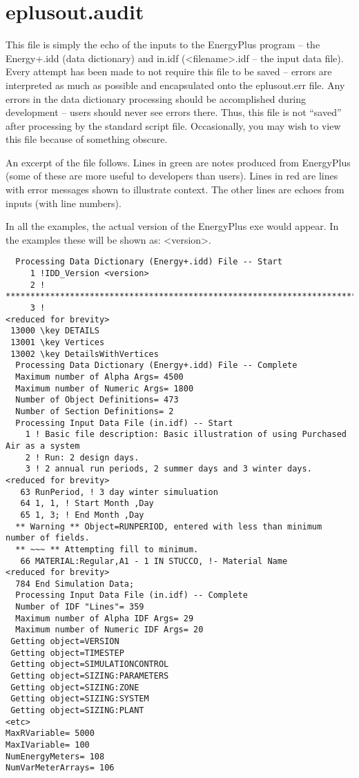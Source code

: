 \section{eplusout.audit}\label{eplusout.audit}

This file is simply the echo of the inputs to the EnergyPlus program -- the Energy+.idd (data dictionary) and in.idf (\textless{}filename\textgreater{}.idf -- the input data file). Every attempt has been made to not require this file to be saved -- errors are interpreted as much as possible and encapsulated onto the eplusout.err file. Any errors in the data dictionary processing should be accomplished during development -- users should never see errors there. Thus, this file is not ``saved'' after processing by the standard script file. Occasionally, you may wish to view this file because of something obscure.

An excerpt of the file follows. Lines in green are notes produced from EnergyPlus (some of these are more useful to developers than users). Lines in red are lines with error messages shown to illustrate context. The other lines are echoes from inputs (with line numbers).

In all the examples, the actual version of the EnergyPlus exe would appear. In the examples these will be shown as: \textless{}version\textgreater{}.

\begin{lstlisting}
  Processing Data Dictionary (Energy+.idd) File -- Start
     1 !IDD_Version <version>
     2 ! **************************************************************************
     3 !
<reduced for brevity>
 13000 \key DETAILS
 13001 \key Vertices
 13002 \key DetailsWithVertices
  Processing Data Dictionary (Energy+.idd) File -- Complete
  Maximum number of Alpha Args= 4500
  Maximum number of Numeric Args= 1800
  Number of Object Definitions= 473
  Number of Section Definitions= 2
  Processing Input Data File (in.idf) -- Start
    1 ! Basic file description: Basic illustration of using Purchased Air as a system
    2 ! Run: 2 design days.
    3 ! 2 annual run periods, 2 summer days and 3 winter days.
<reduced for brevity>
   63 RunPeriod, ! 3 day winter simuluation
   64 1, 1, ! Start Month ,Day
   65 1, 3; ! End Month ,Day
  ** Warning ** Object=RUNPERIOD, entered with less than minimum number of fields.
  ** ~~~ ** Attempting fill to minimum.
   66 MATERIAL:Regular,A1 - 1 IN STUCCO, !- Material Name
<reduced for brevity>
  784 End Simulation Data;
  Processing Input Data File (in.idf) -- Complete
  Number of IDF "Lines"= 359
  Maximum number of Alpha IDF Args= 29
  Maximum number of Numeric IDF Args= 20
 Getting object=VERSION
 Getting object=TIMESTEP
 Getting object=SIMULATIONCONTROL
 Getting object=SIZING:PARAMETERS
 Getting object=SIZING:ZONE
 Getting object=SIZING:SYSTEM
 Getting object=SIZING:PLANT
<etc>
MaxRVariable= 5000
MaxIVariable= 100
NumEnergyMeters= 108
NumVarMeterArrays= 106
\end{lstlisting}

